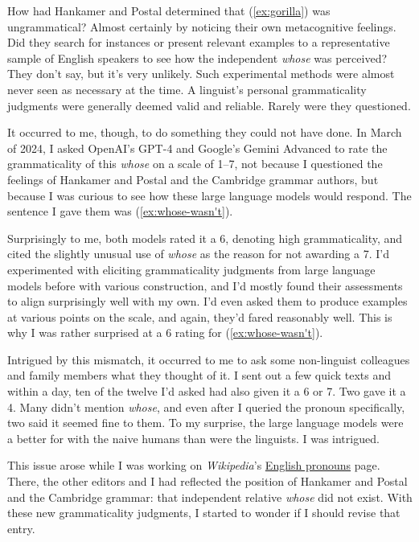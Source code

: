 How had Hankamer and Postal determined that (\ref{ex:gorilla}) was ungrammatical? Almost certainly by noticing their own metacognitive feelings. Did they search for instances or present relevant examples to a representative sample of English speakers to see how the independent \textit{whose} was perceived? They don't say, but it's very unlikely. Such experimental methods were almost never seen as necessary at the time. A linguist's personal  grammaticality judgments were generally deemed valid and reliable. Rarely were they questioned.

It occurred to me, though, to do something they could not have done. In March of 2024, I asked OpenAI's GPT-4 and Google's Gemini Advanced to rate the grammaticality of this \textit{whose} on a scale of 1--7, not because I questioned the feelings of Hankamer and Postal and the Cambridge grammar authors, but because I was curious to see how these large language models would respond. The sentence I gave them was (\ref{ex:whose-wasn't}).

 \label{ex:whose-wasn't}
\z

Surprisingly to me, both models rated it a 6, denoting high grammaticality, and cited the slightly unusual use of \textit{whose} as the reason for not awarding a 7. I'd experimented with eliciting grammaticality judgments from large language models before with various construction, and I'd mostly found their assessments to align surprisingly well with my own. I'd even asked them to produce examples at various points on the scale, and again, they'd fared reasonably well. This is why I was rather surprised at a 6 rating for (\ref{ex:whose-wasn't}).

Intrigued by this mismatch, it occurred to me to ask some non-linguist colleagues and family members what they thought of it. I sent out a few quick texts and within a day, ten of the twelve I'd asked had also given it a 6 or 7. Two gave it a 4. Many didn't mention \textit{whose}, and even after I queried the pronoun specifically, two said it seemed fine to them. To my surprise, the large language models were a better for with the naive humans than were the linguists. I was intrigued.

This issue arose while I was working on \textit{Wikipedia}'s \href{https://en.wikipedia.org/wiki/English_pronouns}{English pronouns} page. There, the other editors and I had reflected the position of Hankamer and Postal and the Cambridge grammar: that independent relative \textit{whose} did not exist. With these new grammaticality judgments, I started to wonder if I should revise that entry.

